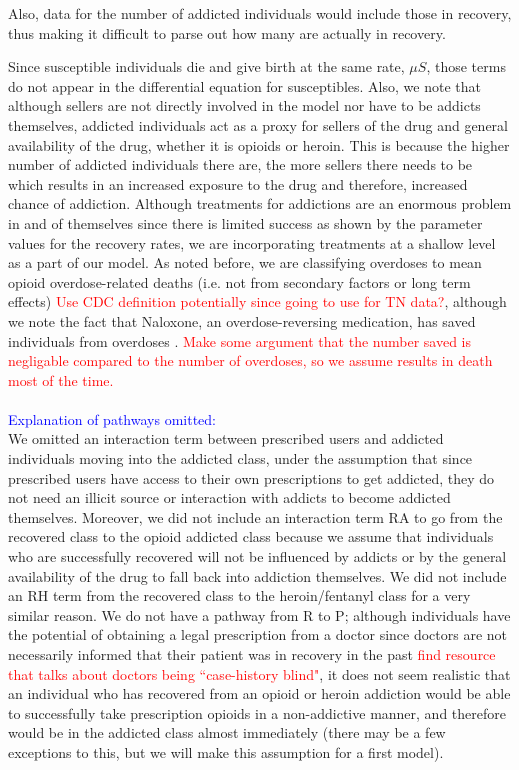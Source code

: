 \documentclass[12pt]{article}
\begin{document}
Also, data for the number of addicted individuals would include those in recovery, thus making it difficult to parse out how many are actually in recovery. 




Since susceptible individuals die and give birth at the same rate, $\mu S$, those terms do not appear in the differential equation for susceptibles. Also, we note that although sellers are not directly involved in the model nor have to be addicts themselves, addicted individuals act as a proxy for sellers of the drug and general availability of the drug, whether it is opioids or heroin. This is because the higher number of addicted individuals there are, the more sellers there needs to be which results in an increased exposure to the drug and therefore, increased chance of addiction. Although treatments for addictions are an enormous problem in and of themselves since there is limited success as shown by the parameter values for the recovery rates, we are incorporating treatments at a shallow level as a part of our model. As noted before, we are classifying overdoses to mean opioid overdose-related deaths (i.e. not from secondary factors or long term effects) \textcolor{red}{Use CDC definition potentially since going to use for TN data?},
although we note the fact that Naloxone, an overdose-reversing medication, has saved individuals from overdoses \cite{NIDA2}. \textcolor{red}{Make some argument that the number saved is negligable compared to the number of overdoses, so we assume results in death most of the time.}\\ \\
\textcolor{blue}{Explanation of pathways omitted:} \\
We omitted an interaction term between prescribed users and addicted individuals moving into the addicted class, under the assumption that since prescribed users have access to their own prescriptions to get addicted, they do not need an illicit source or interaction with addicts to become addicted themselves. Moreover, we did not include an interaction term RA to go from the recovered class to the opioid addicted class because we assume that individuals who are successfully recovered will not be influenced by addicts or by the general availability of the drug to fall back into addiction themselves. We did not include an RH term from the recovered class to the heroin/fentanyl class for a very similar reason. We do not have a pathway from R to P; although individuals have the potential of obtaining a legal prescription from a doctor since doctors are not necessarily informed that their patient was in recovery in the past \textcolor{red}{find resource that talks about doctors being ``case-history blind"}, it does not seem realistic that an individual who has recovered from an opioid or heroin addiction would be able to successfully take prescription opioids in a non-addictive manner, and therefore would be in the addicted class almost immediately (there may be a few exceptions to this, but we will make this assumption for a first model).\\
\end{document}

